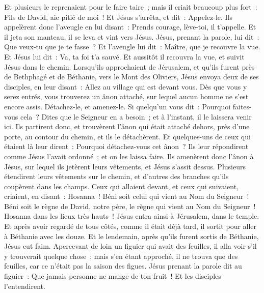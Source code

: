 \begin{multicols}{2}
Et plusieurs le reprenaient pour le faire taire~; mais il criait beaucoup plus fort~: Fils de David, aie pitié de moi~!
Et Jésus s'arrêta, et dit~: Appelez-le. Ils appelèrent donc l'aveugle en lui disant~: Prends courage, lève-toi, il t'appelle.
Et il jeta son manteau, il se leva et vint vers Jésus.
Jésus, prenant la parole, lui dit~: Que veux-tu que je te fasse~? Et l'aveugle lui dit~: Maître, que je recouvre la vue.
Et Jésus lui dit~: Va, ta foi t'a sauvé.
Et aussitôt il recouvra la vue, et suivit Jésus dans le chemin.
\VerseOne{}Lorsqu'ils approchaient de Jérusalem, et qu'ils furent près de Bethphagé et de Béthanie, vers le Mont des Oliviers, Jésus envoya deux de ses disciples,
en leur disant~: Allez au village qui est devant vous. Dès que vous y serez entrés, vous trouverez un ânon attaché, sur lequel aucun homme ne s'est encore assis. Détachez-le, et amenez-le.
Si quelqu'un vous dit~: Pourquoi faites-vous cela~? Dites que le Seigneur en a besoin~; et à l'instant, il le laissera venir ici.
Ils partirent donc, et trouvèrent l'ânon qui était attaché dehors, près d'une porte, au contour du chemin, et ils le détachèrent.
Et quelques-uns de ceux qui étaient là leur dirent~: Pourquoi détachez-vous cet ânon~?
Ils leur répondirent comme Jésus l'avait ordonné~; et on les laissa faire.
Ils amenèrent donc l'ânon à Jésus, sur lequel ils jetèrent leurs vêtements, et Jésus s'assit dessus.
Plusieurs étendirent leurs vêtements sur le chemin, et d'autres des branches qu'ils coupèrent dans les champs.
Ceux qui allaient devant, et ceux qui suivaient, criaient, en disant~: Hosanna~! Béni soit celui qui vient au Nom du Seigneur~!
Béni soit le règne de David, notre père, le règne qui vient au Nom du Seigneur~! Hosanna dans les lieux très hauts~!
Jésus entra ainsi à Jérusalem, dans le temple. Et après avoir regardé de tous côtés, comme il était déjà tard, il sortit pour aller à Béthanie avec les douze.
Et le lendemain, après qu'ils furent sortis de Béthanie, Jésus eut faim.
Apercevant de loin un figuier qui avait des feuilles, il alla voir s'il y trouverait quelque chose~; mais s'en étant approché, il ne trouva que des feuilles, car ce n'était pas la saison des figues.
Jésus prenant la parole dit au figuier~: Que jamais personne ne mange de ton fruit~! Et les disciples l'entendirent.

\end{multicols}

